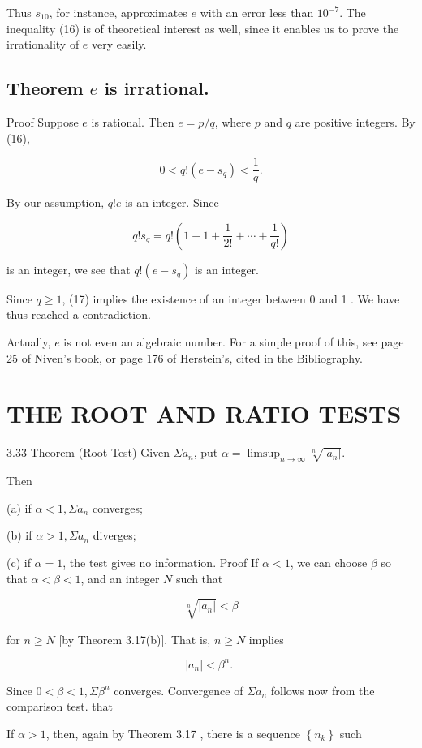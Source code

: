 \documentclass[10pt]{article}
\begin{document}
Thus $s_{10}$, for instance, approximates $e$ with an error less than $10^{-7}$. The inequality (16) is of theoretical interest as well, since it enables us to prove the irrationality of $e$ very easily.

\subsection{Theorem $e$ is irrational.}
Proof Suppose $e$ is rational. Then $e=p / q$, where $p$ and $q$ are positive integers. By (16),

$$
0<q !\left(e-s_{q}\right)<\frac{1}{q} .
$$

By our assumption, $q ! e$ is an integer. Since

$$
q ! s_{q}=q !\left(1+1+\frac{1}{2 !}+\cdots+\frac{1}{q !}\right)
$$

is an integer, we see that $q !\left(e-s_{q}\right)$ is an integer.

Since $q \geq 1$, (17) implies the existence of an integer between 0 and 1 . We have thus reached a contradiction.

Actually, $e$ is not even an algebraic number. For a simple proof of this, see page 25 of Niven's book, or page 176 of Herstein's, cited in the Bibliography.

\section{THE ROOT AND RATIO TESTS}
3.33 Theorem (Root Test) Given $\Sigma a_{n}$, put $\alpha=\limsup _{n \rightarrow \infty} \sqrt[n]{\left|a_{n}\right|}$.

Then

(a) if $\alpha<1, \Sigma a_{n}$ converges;

(b) if $\alpha>1, \Sigma a_{n}$ diverges;

(c) if $\alpha=1$, the test gives no information. Proof If $\alpha<1$, we can choose $\beta$ so that $\alpha<\beta<1$, and an integer $N$ such that

$$
\sqrt[n]{\left|a_{n}\right|}<\beta
$$

for $n \geq N$ [by Theorem 3.17(b)]. That is, $n \geq N$ implies

$$
\left|a_{n}\right|<\beta^{n} \text {. }
$$

Since $0<\beta<1, \Sigma \beta^{n}$ converges. Convergence of $\Sigma a_{n}$ follows now from the comparison test. that

If $\alpha>1$, then, again by Theorem 3.17 , there is a sequence $\left\{n_{k}\right\}$ such
\end{document}
